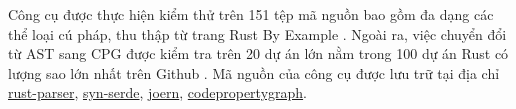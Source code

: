 Công cụ được thực hiện kiểm thử trên 151 tệp mã nguồn bao gồm đa dạng các thể loại cú pháp, thu thập từ trang Rust By Example \cite{rustlangIntroductionRust}.
Ngoài ra, việc chuyển đổi từ AST sang CPG được kiểm tra trên 20 dự án lớn nằm trong 100 dự án Rust có lượng sao lớn nhất trên Github \cite {githubGithubRankingTop100RustmdMaster}.
Mã nguồn của công cụ được lưu trữ tại địa chỉ \href{https://github.com/congnghiahieu/rust-parser}{rust-parser}, \href{https://github.com/congnghiahieu/syn-serde}{syn-serde}, \href{https://github.com/congnghiahieu/joern}{joern}, \href{https://github.com/congnghiahieu/codepropertygraph}{codepropertygraph}.
